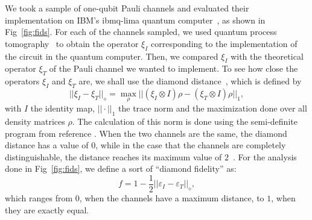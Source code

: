 \documentclass[10pt,letterpaper]{article} %
\newcommand{\fref}[1]{Fig~\ref{#1}}
\begin{document}
We took a sample of one-qubit Pauli channels
and evaluated their implementation on IBM's
ibmq-lima quantum computer~\cite{Qiskit},
as shown in \fref{fig:fids}. 
For each of the channels sampled, we used 
quantum process tomography~\cite{Qiskit, Chuang:1996} to obtain the 
operator $\xi_I$ corresponding to the implementation of the
circuit in the quantum computer. 
Then, we compared $\xi_I$ with the theoretical 
operator $\xi_T$ of the Pauli channel we wanted to implement.
To see how close the operators $\xi_I$ and 
$\xi_T$ are, we shall use the
diamond distance~\cite{Aharonov,Wilde}, which is defined by
\begin{equation}
||\xi_I - \xi_T ||_{\diamond}  = \max_{\rho} || (\xi_I \otimes I) \rho - (\xi_T \otimes I) \rho ||_1,
\end{equation}
with $I$ the identity map,
$|| \cdot ||_1$ the trace norm and the maximization
done over all density matrices $\rho$.
The calculation of this norm is done using the semi-definite program from reference \cite{Watrous}.
When the two channels are the same,
the diamond distance has a value of $0$, while in the case that the channels
are completely distinguishable, the distance reaches its maximum value of $2$~\cite{Benenti}.
For the analysis done in \fref{fig:fids}, we define a sort of ``diamond fidelity'' as: 
\begin{equation}
f = 1 - \dfrac{1}{2} ||\varepsilon_I - \varepsilon_T ||_{\diamond},
\label{eq:diamond-fid}
\end{equation}
which ranges from $0$, when the channels have a maximum distance, to  $1$,
when they are exactly equal.
\end{document}
